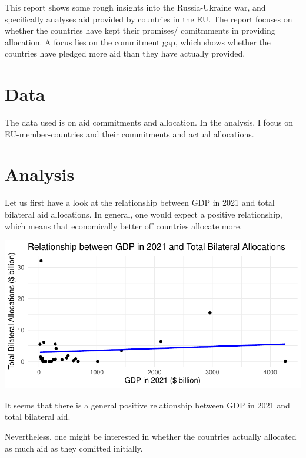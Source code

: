 \documentclass[11pt,preprint, authoryear]{elsarticle}
\let\origfigure\figure
\let\endorigfigure\endfigure
\renewenvironment{figure}[1][2] {
    \expandafter\origfigure\expandafter[H]
} {
    \endorigfigure
}
\numberwithin{equation}{section}
\numberwithin{figure}{section}
\numberwithin{table}{section}
\begin{document}
This report shows some rough insights into the Russia-Ukraine war, and
specifically analyses aid provided by countries in the EU. The report
focuses on whether the countries have kept their promises/ comitmments
in providing allocation. A focus lies on the commitment gap, which shows
whether the countries have pledged more aid than they have actually
provided.

\hypertarget{data}{%
\section{Data}\label{data}}

The data used is on aid commitments and allocation. In the analysis, I
focus on EU-member-countries and their commitments and actual
allocations.

\hypertarget{analysis}{%
\section{Analysis}\label{analysis}}

Let us first have a look at the relationship between GDP in 2021 and
total bilateral aid allocations. In general, one would expect a positive
relationship, which means that economically better off countries
allocate more.

\begin{figure}[H]

{\centering \includegraphics{Question3_files/figure-latex/Figure1-1} 

}

\caption{Who allocates Aid \label{Figure1}}\label{fig:Figure1}
\end{figure}

It seems that there is a general positive relationship between GDP in
2021 and total bilateral aid.

Nevertheless, one might be interested in whether the countries actually
allocated as much aid as they comitted initially.
\end{document}

